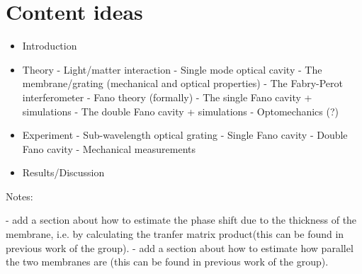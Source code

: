 
\section{Content ideas}

\begin{itemize}
    \item Introduction
    \item Theory
    \subitem - Light/matter interaction
    \subitem - Single mode optical cavity
    \subitem - The membrane/grating (mechanical and optical properties) 
    \subitem - The Fabry-Perot interferometer
    \subitem - Fano theory (formally) 
    \subitem - The single Fano cavity + simulations
    \subitem - The double Fano cavity + simulations
    \subitem - Optomechanics (?)
    \item Experiment
    \subitem - Sub-wavelength optical grating
    \subitem - Single Fano cavity
    \subitem - Double Fano cavity
    \subitem - Mechanical measurements
    \item Results/Discussion
\end{itemize}

Notes:

 - add a section about how to estimate the phase shift due to the thickness of the membrane, i.e. by calculating the tranfer matrix product(this can be found in previous work of the group).
 - add a section about how to estimate how parallel the two membranes are (this can be found in previous work of the group).

